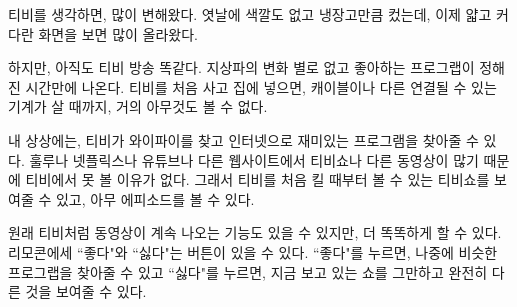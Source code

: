 \documentclass[11pt]{article}
\begin{document}
티비를 생각하면, 많이 변해왔다. 엿날에 색깔도 없고 냉장고만큼 컸는데, 이제 얇고 커다란 화면을 보면 많이 올라왔다.

하지만, 아직도 티비 방송 똑같다. 지상파의 변화 별로 없고 좋아하는 프로그랩이 정해진 시간만에 나온다. 티비를 처음 사고 집에 넣으면, 캐이블이나 다른 연결될 수 있는 기계가 살 때까지, 거의 아무것도 볼 수 없다.

내 상상에는, 티비가 와이파이를 찾고 인터넷으로 재미있는 프로그램을 찾아줄 수 있다. 훌루나 넷플릭스나 유튜브나 다른 웹사이트에서 티비쇼나 다른 동영상이 많기 때문에 티비에서 못 볼 이유가 없다.  그래서 티비를 처음 킬 때부터 볼 수 있는 티비쇼를 보여줄 수 있고, 아무 에피소드를 볼 수 있다.

원래 티비처럼 동영상이 계속 나오는 기능도 있을 수 있지만, 더 똑똑하게 할 수 있다.  리모콘에세 ``좋다"와 ``싫다"는 버튼이 있을 수 있다.  ``좋다"를 누르면, 나중에 비슷한 프로그랩을 찾아줄 수 있고 ``싫다"를 누르면, 지금 보고 있는 쇼를 그만하고 완전히 다른 것을 보여줄 수 있다.
\end{document}
